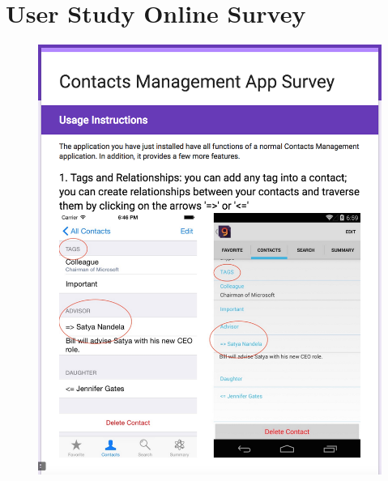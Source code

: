 \documentclass{uofsthesis-cs}
\begin{document}
\chapter{User Study Online Survey}

\begin{figure}[!h]
\begin{center}
\includegraphics[scale=0.4]{pics/survey1.png}
\end{center}
\end{figure}
\end{document}
